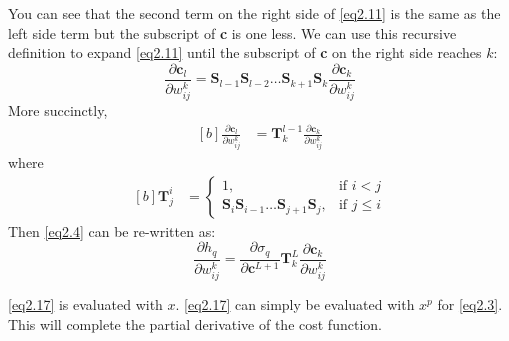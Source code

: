 \documentclass[letterpaper, 11pt]{article}
\newcommand{\pd}[2]{\frac{\partial#1}{\partial#2}}
\newcommand{\w}{w^{k}_{ij}}
\numberwithin{equation}{section}
\numberwithin{figure}{section}
\numberwithin{table}{section}
\begin{document}
You can see that the second term on the right side of \ref{eq2.11} is the same as the left side term but the subscript of \textbf{c} is one less. We can use this recursive definition to expand \ref{eq2.11} until the subscript of \textbf{c} on the right side reaches \(k\):
\begin{equation}
	\pd{\textbf{c}_{l}}{\w} 
	= \textbf{S}_{l-1}\textbf{S}_{l-2}\hdots\textbf{S}_{k+1}\textbf{S}_{k}
		\pd{\textbf{c}_{k}}{\w}
\end{equation}
More succinctly, 
\begin{equation}
	\begin{aligned}[b]
		\pd{\textbf{c}_{l}}{\w} 
		&= \textbf{T}^{l-1}_{k}\pd{\textbf{c}_{k}}{\w}
	\end{aligned}
\end{equation}
where
\begin{equation}
	\begin{aligned}[b]
		\textbf{T}^{i}_{j}
			&=\begin{cases}
			1, 	&\text{if } i < j\\
			\textbf{S}_{i}\textbf{S}_{i-1}\hdots\textbf{S}_{j+1}\textbf{S}_{j}, 
				&\text{if } j \le i
		\end{cases}
	\end{aligned}
\end{equation}
Then \ref{eq2.4} can be re-written as:
\begin{equation}
	\pd{h_{q}}{\w} 
	= \pd{\sigma_{q}}{\textbf{c}^{L+1}}\textbf{T}^{L}_{k}\pd{\textbf{c}_{k}}{\w}\label{eq2.17}
\end{equation}

\ref{eq2.17} is evaluated with \(x\). \ref{eq2.17} can simply be evaluated with \(x^{p}\) for \ref{eq2.3}. This will complete the partial derivative of the cost function.

\clearpage
\pagestyle{plain}
\printbibliography
{}
\printindex
\end{document}
